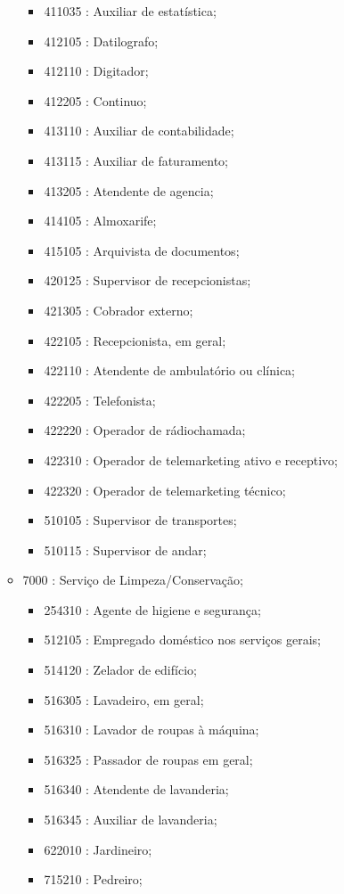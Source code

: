 \begin{itemize}
\begin{itemize}
\begin{itemize}
      \item 411035 : Auxiliar de estatística;
      \item 412105 : Datilografo;
      \item 412110 : Digitador;
      \item 412205 : Continuo;
      \item 413110 : Auxiliar de contabilidade;
      \item 413115 : Auxiliar de faturamento;
      \item 413205 : Atendente de agencia;
      \item 414105 : Almoxarife;
      \item 415105 : Arquivista de documentos;
      \item 420125 : Supervisor de recepcionistas;
      \item 421305 : Cobrador externo;
      \item 422105 : Recepcionista, em geral;
      \item 422110 : Atendente de ambulatório ou clínica;
      \item 422205 : Telefonista;
      \item 422220 : Operador de rádiochamada;
      \item 422310 : Operador de telemarketing ativo e receptivo;
      \item 422320 : Operador de telemarketing técnico;
      \item 510105 : Supervisor de transportes;
      \item 510115 : Supervisor de andar;
    \end{itemize}
    \item 7000 : Serviço de Limpeza/Conservação;
    \begin{itemize}
      \item 254310 : Agente de higiene e segurança;
      \item 512105 : Empregado doméstico nos serviços gerais;
      \item 514120 : Zelador de edifício;
      \item 516305 : Lavadeiro, em geral;
      \item 516310 : Lavador de roupas à máquina;
      \item 516325 : Passador de roupas em geral;
      \item 516340 : Atendente de lavanderia;
      \item 516345 : Auxiliar de lavanderia;
      \item 622010 : Jardineiro;
      \item 715210 : Pedreiro;

\end{itemize}
\end{itemize}
\end{itemize}
